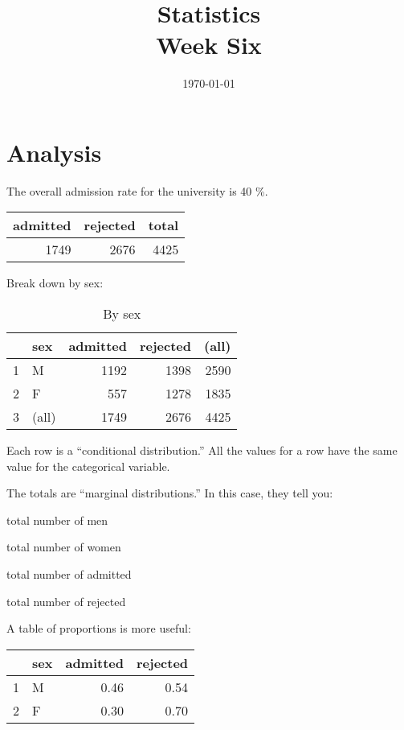 \documentclass[landscape]{exam}
\title{Statistics \\ Week Six}
\date{\today}
\author{}
\begin{document}
  \maketitle
  \tableofcontents

  \section{Analysis}

  The overall admission rate for the university is 40 \%.

  \begin{table}[H]
    \centering
    \begin{tabular}{rrr}
      \toprule
      admitted & rejected & total \\
      \midrule
      1749     & 2676     & 4425 \\
      \bottomrule
    \end{tabular}
  \end{table}

  Break down by sex:
  \begin{table}[H]
    \centering
    \begin{tabular}{rlrrr}
      \toprule
                & sex   & admitted & rejected & (all) \\
      \midrule
      1         & M     & 1192     & 1398     & 2590 \\
      2         & F     & 557      & 1278     & 1835 \\
      3         & (all) & 1749     & 2676     & 4425 \\
       \bottomrule
    \end{tabular}
    \caption{By sex}
  \end{table}

  Each row is a ``conditional distribution.'' All the values for a row have the
  same value for the categorical variable.

  The totals are ``marginal distributions.'' In this case, they tell you:
  \begin{itemize*}
    \item total number of men
    \item total number of women
    \item total number of admitted
    \item total number of rejected
  \end{itemize*}

  A table of proportions is more useful:
  \begin{table}[H]
    \centering
    \begin{tabular}{rlrr}
      \toprule
                & sex & admitted & rejected \\
      \midrule
      1         & M   & 0.46     & 0.54 \\
      2         & F   & 0.30     & 0.70 \\
       \bottomrule
    \end{tabular}
  \end{table}
\end{document}
